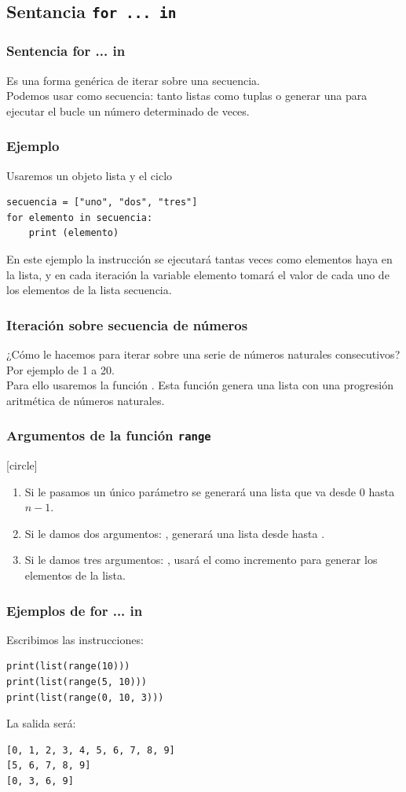 \subsection{Sentancia \texttt{for ... in}}
\begin{frame}\frametitle{Sentencia for ... in}
Es una forma genérica de iterar sobre una secuencia.
\\
\bigskip
Podemos usar como secuencia: tanto listas como tuplas o generar una para ejecutar el bucle un número determinado de veces.
\end{frame}
\begin{frame}[fragile]
\frametitle{Ejemplo}
Usaremos un objeto lista y el ciclo 
\pause
\begin{lstlisting}
secuencia = ["uno", "dos", "tres"]
for elemento in secuencia:
    print (elemento)
\end{lstlisting}
\pause
En este ejemplo la instrucción  se ejecutará tantas veces como elementos haya en la lista, y en cada iteración la variable elemento tomará el valor de cada uno de los elementos de la lista secuencia.
\end{frame}
\begin{frame}
\frametitle{Iteración sobre secuencia de números}
¿Cómo le hacemos para iterar sobre una serie de números naturales consecutivos?
\\
\bigskip
Por ejemplo de 1 a 20.
\\
\bigskip
\pause
 Para ello usaremos la función . Esta función genera una lista con una progresión aritmética de números naturales.
 \end{frame}
\begin{frame}
\frametitle{Argumentos de la función \texttt{range}}
[circle]
\begin{enumerate}[<+->]
\item Si le pasamos un único parámetro se generará una lista que va desde $0$ hasta $n-1$. 
\item Si le damos dos argumentos: , generará una lista desde  hasta .
\item Si le damos tres argumentos: , usará el  como incremento para generar los elementos de la lista.
\end{enumerate}  
\end{frame}
\begin{frame}[fragile]
\frametitle{Ejemplos de for ... in}
Escribimos las instrucciones:
\begin{lstlisting}
print(list(range(10)))
print(list(range(5, 10)))
print(list(range(0, 10, 3)))
\end{lstlisting}
\pause
La salida será:
\begin{lstlisting}
[0, 1, 2, 3, 4, 5, 6, 7, 8, 9]
[5, 6, 7, 8, 9]
[0, 3, 6, 9]
\end{lstlisting}
\end{frame}
